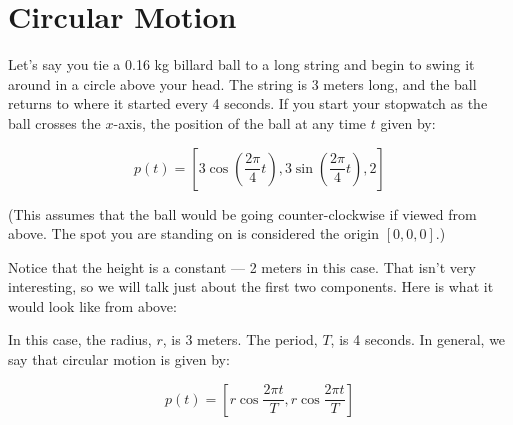 \chapter{Circular Motion}

Let's say you tie a 0.16 kg billard ball to a long string and begin to swing
it around in a circle above your head. The string is 3
meters long, and the ball returns to where it started every 4
seconds. If you start your stopwatch as the ball crosses the
$x$-axis, the position of the ball at any time $t$ given by:

$$p(t) = [3 \cos{\left( \frac{2 \pi} {4}t\right)}, 3 \sin{ \left( \frac{2 \pi}{4}t\right) }, 2]$$

(This assumes that the ball would be going counter-clockwise if viewed
from above. The spot you are standing on is considered the origin $[0, 0, 0]$.)

Notice that the height is a constant --- 2 meters in this
case. That isn't very interesting, so we will talk just about the
first two components.  Here is what it would look like from above:


In this case, the radius, $r$, is 3 meters.  The period, $T$, is 4
seconds.  In general, we say that circular motion is given by:

$$p(t) = \left[ r \cos{\frac{2 \pi t}{T}}, r \cos{\frac{2 \pi t}{T}}\right]$$

